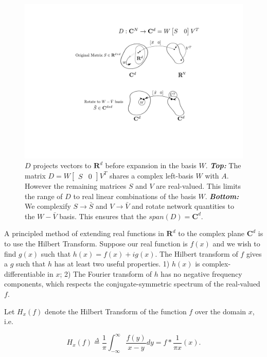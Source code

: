 \begin{enumerate}
\begin{figure}
\centering
\includegraphics[scale=.6]{figures/linear_map_sequence_complex}
\caption{$D$ projects vectors to $\mathbf{R}^d$ before expansion in the basis $W$. \textbf{\textit{Top: }} The matrix $D=W \begin{bmatrix} S & 0 \end{bmatrix} V^T$ shares a complex left-basis $W$ with $A$. However the remaining matrices $S$ and $V$ are real-valued. This limits the range of $D$ to real linear combinations of the basis $W$. \textbf{\textit{Bottom:}} We complexify $S \rightarrow \bar{S}$ and $V \rightarrow \bar{V}$ and rotate network quantities to the $W-\bar{V}$ basis. This ensures that the $span(D) = \mathbf{C}^d$.
}
\label{fig:linear_maps_between_subspaces_D_complex}
\end{figure}

\clearpage

A principled method of extending real functions in $\mathbf{R}^d$ to the complex plane $\mathbf{C}^d$ is to use the Hilbert Transform. Suppose our real function is $f(x)$ and we wish to find $g(x)$ such that $h(x) = f(x) + ig(x)$. The Hilbert transform of $f$ gives a $g$ such that $h$ has at least two useful properties. 1) $h(x)$ is complex-differentiable in $x$; 2) The Fourier transform of $h$ has no negative frequency components, which respects the conjugate-symmetric spectrum of the real-valued $f$. 

Let $H_x(f)$ denote the Hilbert Transform of the function $f$ over the domain $x$, i.e. 

$$
H_x(f) \overset{\Delta}{=} \frac{1}{\pi} \int_{-\infty}^{\infty} \frac{f(y)}{x - y} dy
=
f * \frac{1}{\pi x} (x). 
$$


\end{enumerate}
